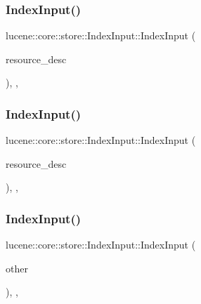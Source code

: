 \subsubsection{\texorpdfstring{Index\+Input()}{IndexInput()}\hspace{0.1cm}{\footnotesize\ttfamily [1/4]}}
{\footnotesize\ttfamily lucene\+::core\+::store\+::\+Index\+Input\+::\+Index\+Input (\begin{DoxyParamCaption}\item[{\mbox{\hyperlink{ZlibCrc32_8h_a2c212835823e3c54a8ab6d95c652660e}{const}} std\+::string \&}]{resource\+\_\+desc }\end{DoxyParamCaption})\hspace{0.3cm}{\ttfamily [inline]}, {\ttfamily [explicit]}, {\ttfamily [protected]}}

\mbox{\label{classlucene_1_1core_1_1store_1_1IndexInput_ab44b2af4586b443c23c5f709e57ec218}} 
\subsubsection{\texorpdfstring{Index\+Input()}{IndexInput()}\hspace{0.1cm}{\footnotesize\ttfamily [2/4]}}
{\footnotesize\ttfamily lucene\+::core\+::store\+::\+Index\+Input\+::\+Index\+Input (\begin{DoxyParamCaption}\item[{std\+::string \&\&}]{resource\+\_\+desc }\end{DoxyParamCaption})\hspace{0.3cm}{\ttfamily [inline]}, {\ttfamily [explicit]}, {\ttfamily [protected]}}

\mbox{\label{classlucene_1_1core_1_1store_1_1IndexInput_a58b86342cc2687096e890f4ed0249abe}} 
\subsubsection{\texorpdfstring{Index\+Input()}{IndexInput()}\hspace{0.1cm}{\footnotesize\ttfamily [3/4]}}
{\footnotesize\ttfamily lucene\+::core\+::store\+::\+Index\+Input\+::\+Index\+Input (\begin{DoxyParamCaption}\item[{\mbox{\hyperlink{ZlibCrc32_8h_a2c212835823e3c54a8ab6d95c652660e}{const}} \mbox{\hyperlink{classlucene_1_1core_1_1store_1_1IndexInput}{Index\+Input}} \&}]{other }\end{DoxyParamCaption})\hspace{0.3cm}{\ttfamily [inline]}, {\ttfamily [explicit]}, {\ttfamily [protected]}}

